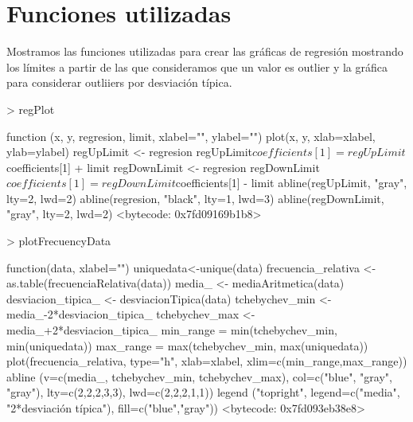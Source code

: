 \documentclass [a4paper] {article}
\begin{document}
\section{Funciones utilizadas}
Mostramos las funciones utilizadas para crear las gráficas de regresión mostrando los límites a partir de las que consideramos que un valor es outlier y la gráfica para considerar outliiers por desviación típica.
\begin{Schunk}
\begin{Sinput}
> regPlot
\end{Sinput}
\begin{Soutput}
function (x, y, regresion, limit, xlabel="", ylabel="") {
  plot(x, y, xlab=xlabel, ylab=ylabel)
  regUpLimit <- regresion
  regUpLimit$coefficients[1] = regUpLimit$coefficients[1] + limit
  regDownLimit <- regresion
  regDownLimit$coefficients[1] = regDownLimit$coefficients[1] - limit
  abline(regUpLimit, "gray", lty=2, lwd=2)
  abline(regresion, "black", lty=1, lwd=3)
  abline(regDownLimit, "gray", lty=2, lwd=2)
}
<bytecode: 0x7fd09169b1b8>
\end{Soutput}
\begin{Sinput}
> plotFrecuencyData
\end{Sinput}
\begin{Soutput}
function(data, xlabel="") {
  uniquedata<-unique(data)
  frecuencia_relativa <- as.table(frecuenciaRelativa(data))
  media_ <- mediaAritmetica(data)
  desviacion_tipica_ <- desviacionTipica(data)
  tchebychev_min <- media_-2*desviacion_tipica_
  tchebychev_max <- media_+2*desviacion_tipica_
  min_range = min(tchebychev_min, min(uniquedata))
  max_range = max(tchebychev_min, max(uniquedata))
  plot(frecuencia_relativa, type="h", xlab=xlabel, xlim=c(min_range,max_range))
  abline (v=c(media_, tchebychev_min, tchebychev_max), 
          col=c("blue", "gray", "gray"), lty=c(2,2,2,3,3),
          lwd=c(2,2,2,1,1))
  legend ("topright", legend=c("media", "2*desviación típica"),
          fill=c("blue","gray"))
}
<bytecode: 0x7fd093eb38e8>
\end{Soutput}
\end{Schunk}
\end{document}
